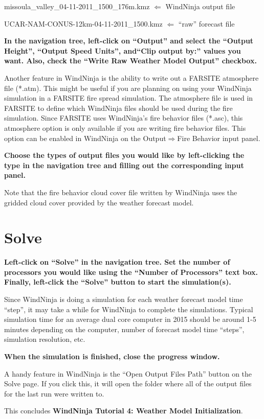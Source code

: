 \documentclass[12pt]{article}
\begin{document}
missoula\_valley\_04-11-2011\_1500\_176m.kmz $\Leftarrow$ WindNinja output file

UCAR-NAM-CONUS-12km-04-11-2011\_1500.kmz  $\Leftarrow$  “raw” forecast file

\textbf{\color{red} In the navigation tree, left-click on “Output” and select the “Output Height”, “Output Speed Units”, and“Clip output by:” values you want.  Also, check the “Write Raw Weather Model Output” checkbox.}

Another feature in WindNinja is the ability to write out a FARSITE atmosphere file (*.atm).  This might be useful if you are planning on using your WindNinja simulation in a FARSITE fire spread simulation.  The atmosphere file is used in FARSITE to define which WindNinja files should be used during the fire simulation.  Since FARSITE uses WindNinja's fire behavior files (*.asc), this atmosphere option is only available if you are writing fire behavior files.  This option can be enabled in WindNinja on the Output$\Rightarrow$Fire Behavior input panel.

\textbf{\color{red}Choose the types of output files you would like by left-clicking the type in the navigation tree and filling out the corresponding input panel.}

Note that the fire behavior cloud cover file written by WindNinja uses the gridded cloud cover provided by the weather forecast model.

\section{Solve}

\textbf{\color{red} Left-click on “Solve” in the navigation tree.  Set the number of processors you would like using the “Number of Processors” text box.  Finally, left-click the “Solve” button to start the simulation(s).}

Since WindNinja is doing a simulation for each weather forecast model time “step”, it may take a while for WindNinja to complete the simulations.  Typical simulation time for an average dual core computer in 2015 should be around 1-5 minutes depending on the computer, number of forecast model time “steps”, simulation resolution, etc.

\textbf{\color{red} When the simulation is finished, close the progress window.}

A handy feature in WindNinja is the “Open Output Files Path” button on the Solve page.  If you click this, it will open the folder where all of the output files for the last run were written to.

This concludes \textbf{WindNinja Tutorial 4: Weather Model Initialization}.
\end{document}
